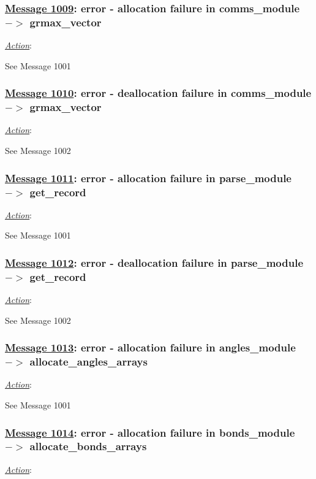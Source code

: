 \subsubsection*{\underline{Message 1009}: error - allocation failure in comms\_module $->$ grmax\_vector}

\noindent \underline{\em Action}:

See Message 1001

\subsubsection*{\underline{Message 1010}: error - deallocation failure in comms\_module $->$ grmax\_vector}

\noindent \underline{\em Action}:

See Message 1002

\subsubsection*{\underline{Message 1011}: error - allocation failure in parse\_module $->$ get\_record}

\noindent \underline{\em Action}:

See Message 1001

\subsubsection*{\underline{Message 1012}: error - deallocation failure in parse\_module $->$ get\_record}

\noindent \underline{\em Action}:

See Message 1002

\subsubsection*{\underline{Message 1013}: error - allocation failure in angles\_module $->$ allocate\_angles\_arrays}

\noindent \underline{\em Action}:

See Message 1001

\subsubsection*{\underline{Message 1014}: error - allocation failure in bonds\_module $->$ allocate\_bonds\_arrays}

\noindent \underline{\em Action}:

